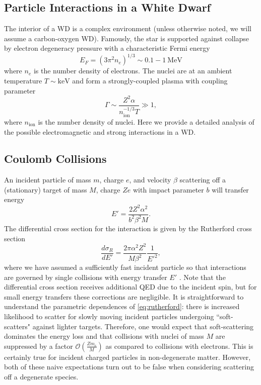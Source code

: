 \documentclass[twocolumn,showpacs,preprintnumbers,amsmath,amssymb,prd]{revtex4}
\newcommand{\OO}{\mathcal{O}}
\def\r{\right)}
\def\l{\left(}
\begin{document}
\begin{appendices}

\section{Particle Interactions in a White Dwarf}
\label{sec:appendix}

The interior of a WD is a complex environment (unless otherwise noted, we will assume a carbon-oxygen WD). Famously, the star is supported against collapse by electron degeneracy pressure with a characteristic Fermi energy
\begin{equation}
E_F = (3 \pi^2 n_e)^{1/3} \sim 0.1 - 1 ~\text{MeV}
\end{equation}
where $n_e$ is the number density of electrons. The nuclei are at an ambient temperature $T \sim \text{keV}$ and form a strongly-coupled plasma with coupling parameter
\begin{equation}
\Gamma \sim \frac{Z^2 \alpha}{n_\text{ion}^{-1/3} T} \gg 1,
\end{equation}
where $n_\text{ion}$ is the number density of nuclei. Here we provide a detailed analysis of the possible electromagnetic and strong interactions in a WD.

\subsection*{Coulomb Collisions}

An incident particle of mass $m$, charge $e$, and velocity $\beta$ scattering off a (stationary) target of mass $M$, charge $Ze$ with impact parameter $b$ will transfer energy
\begin{equation}
\label{eq:impact}
E' = \frac{2 Z^2 \alpha^2}{b^2 \beta ^2 M}.
\end{equation}
The differential cross section for the interaction is given by the Rutherford cross section
\begin{equation}
\label{eq:rutherford}
\frac{d \sigma_R}{dE'} = \frac{2 \pi  \alpha^2 Z^2}{M \beta^2} \frac{1}{E'^2},
 \end{equation}
where we have assumed a sufficiently fast incident particle so that interactions are governed by single collisions with energy transfer $E'$ \cite{Agashe:2014kda}.  Note that the differential cross section receives additional QED due to the incident spin, but for small energy transfers these corrections are negligible. It is straightforward to understand the parametric dependences of \eqref{eq:rutherford}: there is increased likelihood to scatter for slowly moving incident particles undergoing ``soft-scatters" against lighter targets. Therefore, one would expect that soft-scattering dominates the energy loss and that collisions with nuclei of mass $M$ are suppressed by a factor $\OO\l\frac{Z m_e}{M}\r$ as compared to collisions with electrons. This is certainly true for incident charged particles in non-degenerate matter. However, both of these naive expectations turn out to be false when considering scattering off a degenerate species.


\end{appendices}
\end{document}
